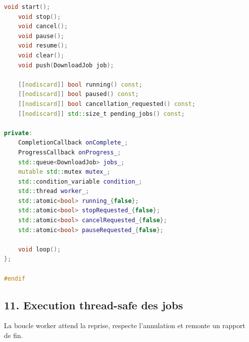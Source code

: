 \documentclass[11pt,a4paper]{article}
\begin{document}
\begin{codebox}
\begin{lstlisting}[language=C++]
    void start();
    void stop();
    void cancel();
    void pause();
    void resume();
    void clear();
    void push(DownloadJob job);

    [[nodiscard]] bool running() const;
    [[nodiscard]] bool paused() const;
    [[nodiscard]] bool cancellation_requested() const;
    [[nodiscard]] std::size_t pending_jobs() const;

private:
    CompletionCallback onComplete_;
    ProgressCallback onProgress_;
    std::queue<DownloadJob> jobs_;
    mutable std::mutex mutex_;
    std::condition_variable condition_;
    std::thread worker_;
    std::atomic<bool> running_{false};
    std::atomic<bool> stopRequested_{false};
    std::atomic<bool> cancelRequested_{false};
    std::atomic<bool> pauseRequested_{false};

    void loop();
};

#endif
\end{lstlisting}
\end{codebox}
\subsection{11. Execution thread-safe des jobs}
La boucle worker attend la reprise, respecte l'annulation et remonte un rapport de fin.
\end{document}
